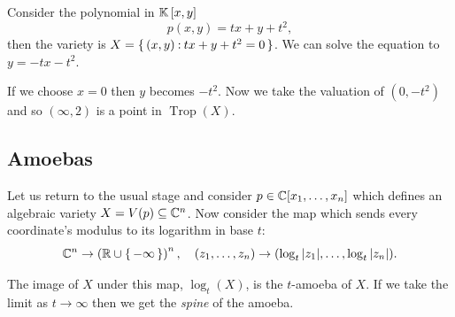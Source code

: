 \documentclass[12pt]{memoir}
\DeclareMathOperator{\Trop}{Trop}
\theoremstyle{definition}
\begin{document}
\begin{Ex}
    Consider the polynomial in $\mathbb{K}\left\lbrack x,y\right\rbrack$ 
    $$p(x,y)=tx+y+t^2,$$
    then the variety is $X=\{\,(x,y)\mathbin{:} tx+y+t^2=0\,\}$. We can solve the equation to $y=-tx-t^2$.\par 
    If we choose $x=0$ then $y$ becomes $-t^2$. Now we take the valuation of $(0,-t^2)$ and so $(\infty,2)$ is a point in $\Trop(X)$.
\end{Ex}

\subsection{Amoebas}

Let us return to the usual stage and consider $p\in\mathbb{C}[x_1,\dots,x_n]$ which defines an algebraic variety $X=V(p)\subseteq\mathbb{C}^n$. Now consider the map which sends every coordinate's modulus to its logarithm in base $t$: 
$$\mathbb{C}^n\to\left(\mathbb{R}\cup\{\,-\infty\,\}\right)^n,\quad (z_1,\dots,z_n)\to(\log_t|z_1|,\dots,\log_t|z_n|).$$


The image of $X$ under this map, $\log_t(X)$, is the $t$-amoeba of $X$. If we take the limit as $t\to\infty$ then we get the \emph{spine} of the amoeba. 
\end{document}
